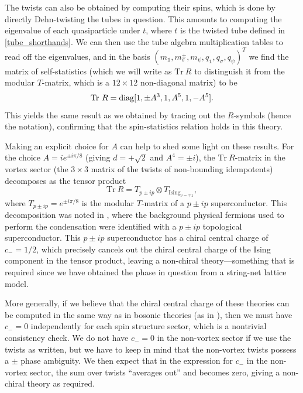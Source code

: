 \documentclass[12pt,a4paper]{article}
\newcommand{\tp}{\otimes}
\newcommand{\unit}{\mathds{1}}
\newcommand\be            {\begin{equation}}
\newcommand\ee            {\end{equation}}
\newcommand{\Tr}{\text{Tr}}
\newcommand{\dave}[1]{{\color{ao(english)}\footnotesize{(DA) #1}}}
\begin{document}
The twists can also be obtained by computing their spins, which is done by directly Dehn-twisting the tubes in question. 
This amounts to computing the eigenvalue of each quasiparticle under $t$, where $t$ is the twisted tube defined in \eqref{tube_shorthands}.
We can then use the tube algebra multiplication tables to read off the eigenvalues, and in the basis $(m_\unit,m^\pm_\sigma,m_\psi,q_\unit,q_\sigma,q_\psi)^T$ we find the matrix of self-statistics (which we will write as $\Tr\ R$ to distinguish it from the modular $T$-matrix, which is a $12\times 12$ non-diagonal matrix) to be
\be \Tr\ R = {\rm diag}[1,\pm A^3,1,A^{5},1,-A^{5}].\ee
This yields the same result as we obtained by tracing out the $R$-symbols (hence the notation), confirming that the spin-statistics relation holds in this theory.

Making an explicit choice for $A$ can help to shed some light on these results. For the choice $A = ie^{\pm i \pi/8}$ (giving $d=+\sqrt{2}$ and $A^4 = \pm i$), the $\Tr\ R$-matrix in the vortex sector (the $3\times3$ matrix of the twists of non-bounding idempotents) decomposes as the tensor product
\be \Tr\ R = T_{p\pm ip} \tp T_{\text{Ising}_{\nu =\mp1}},\ee
where $T_{p\pm ip} = e^{\pm i\pi/8}$ is the modular $T$-matrix of a $p\pm ip$ superconductor. 
This decomposition was noted in \cite{ware2016}, where the background physical fermions used to perform the condensation 
were identified with a $p\pm ip$ topological superconductor. 
This $p\pm ip$ superconductor has a chiral central charge of $c_-=1/2$, which precisely cancels 
out the chiral central charge of the Ising component in the tensor product, leaving a non-chiral theory---something
that is required since we have obtained the phase in question from a string-net lattice model. 


More generally, if we believe that the chiral central charge of these theories can be computed in the same 
way as in bosonic theories (as in \cite{cano2014}), then we must have $c_- =0$ independently 
for each spin structure sector, which is a nontrivial consistency check. We do not have $c_-=0$ in the 
non-vortex sector if we use the twists as written, but we have to keep in mind that the 
non-vortex twists possess a $\pm$ phase ambiguity. We then expect that in the 
expression for $c_-$ in the non-vortex sector, the sum over twists ``averages out'' and becomes zero, 
giving a non-chiral theory as required. 
\end{document}
